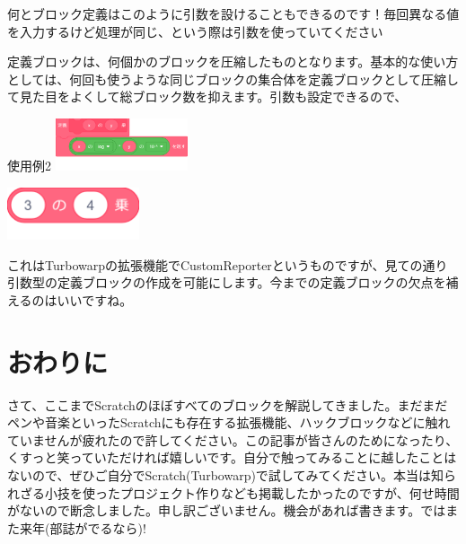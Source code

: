 \documentclass[b5paper,10pt]{jsarticle}
\begin{document}
\begin{multicols*}{3}
何とブロック定義はこのように引数を設けることもできるのです！毎回異なる値を入力するけど処理が同じ、という際は引数を使っていてください

定義ブロックは、何個かのブロックを圧縮したものとなります。基本的な使い方としては、何回も使うような同じブロックの集合体を定義ブロックとして圧縮して見た目をよくして総ブロック数を抑えます。引数も設定できるので、
\begin{itembox}{使用例2}
\includegraphics[width=39mm]{images/teigi_5.png}

\includegraphics[width=39mm]{images/teigi_6.png}
\end{itembox}
これはTurbowarpの拡張機能でCustomReporterというものですが、見ての通り引数型の定義ブロックの作成を可能にします。今までの定義ブロックの欠点を補えるのはいいですね。

\section{おわりに}

さて、ここまでScratchのほぼすべてのブロックを解説してきました。まだまだペンや音楽といったScratchにも存在する拡張機能、ハックブロックなどに触れていませんが疲れたので許してください。この記事が皆さんのためになったり、くすっと笑っていただければ嬉しいです。自分で触ってみることに越したことはないので、ぜひご自分でScratch(Turbowarp)で試してみてください。本当は知られざる小技を使ったプロジェクト作りなども掲載したかったのですが、何せ時間がないので断念しました。申し訳ございません。機会があれば書きます。ではまた来年(部誌がでるなら)!

\end{multicols*}
\end{document}
